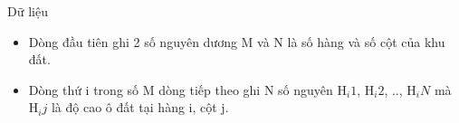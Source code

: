 Dữ liệu
\begin{itemize}
	\item Dòng đầu tiên ghi 2 số nguyên dương M và N là số hàng và số cột của khu đất.
	\item Dòng thứ i trong số M dòng tiếp theo ghi N số nguyên H$_i1$, H$_i2$, .., H$_iN $ mà H$_ij $ là độ cao ô đất tại hàng i, cột j.
\end{itemize}